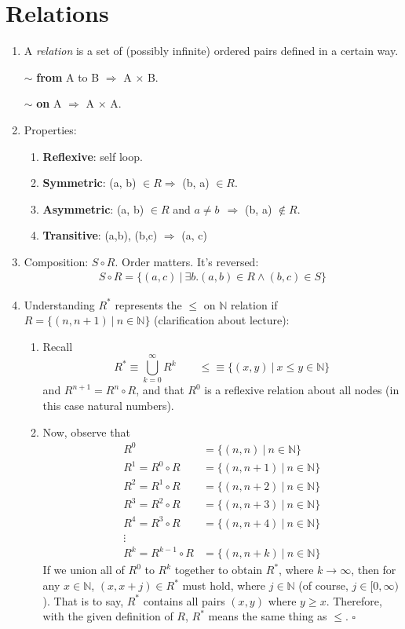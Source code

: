 \documentclass[10pt]{article}
\newcommand{\mapto}{\rightarrow}
\renewcommand{\ll}{\ |\ }
\begin{document}
\section{Relations}
\begin{enumerate}
    \item A \textit{relation} is a set of (possibly infinite) ordered pairs defined in a certain way.
    
    $\sim$ \textbf{from} A to B $\Rightarrow$ A $\times$ B. 
    
    $\sim$ \textbf{on} A $\Rightarrow$ A $\times$ A.
    \item Properties:
    \begin{enumerate}
        \item \textbf{Reflexive}: self loop.
        \item \textbf{Symmetric}: (a, b) $\in R \Rightarrow$ (b, a) $\in R$.
        \item \textbf{Asymmetric}: (a, b) $\in R$ and $a\neq b\ \ \Rightarrow$ (b, a) $\not\in R$.
        \item \textbf{Transitive}: (a,b), (b,c) $\Rightarrow$ (a, c)
    \end{enumerate}
  \item Composition: $S\circ R$. Order matters. It's reversed:
    \begin{align*}
      S\circ R = \{(a,c) \ll \exists b. (a,b)\in R\land (b,c)\in S\}
    \end{align*}
  \item Understanding $R^*$ represents the $\leq$ on $\mathbb{N}$ relation if $R=\{(n,n+1)\ll n\in\mathbb{N}\}$ (clarification about lecture):
    \begin{enumerate}[label=\roman*)]
    \item Recall $$R^*\equiv\bigcup_{k=0}^{\infty} R^k \qquad \leq\equiv\{(x,y)\ll x \leq y \in\mathbb{N}\}$$
      and $R^{n+1}=R^{n}\circ R$, and that $R^0$ is a reflexive relation about all nodes (in this case natural numbers).
    \item Now, observe that
      \begin{align*}
        R^0 &= \{(n,n)\ll n\in\mathbb{N}\}\\
        R^1 = R^0\circ R &= \{(n,n+1)\ll n\in\mathbb{N}\}\\
        R^2 = R^1\circ R &= \{(n,n+2)\ll n\in\mathbb{N}\}\\
        R^3 = R^2\circ R &= \{(n,n+3)\ll n\in\mathbb{N}\}\\
        R^4 = R^3\circ R &= \{(n,n+4)\ll n\in\mathbb{N}\}\\
        \vdots\\
        R^k = R^{k-1}\circ R &= \{(n,n+k)\ll n\in\mathbb{N}\}
      \end{align*}      
      If we union all of $R^0$ to $R^k$ together to obtain $R^*$, where $k\mapto\infty$, then for any $x\in\mathbb{N}$, $(x, x+j)\in R^*$ must hold, where $j\in\mathbb{N}$ (of course, $j\in[0,\infty)$). That is to say, $R^*$ contains all pairs $(x,y)$ where $y\geq x$. Therefore, with the given definition of $R$, $R^*$ means the same thing as $\leq$. $\square$
        

\end{enumerate}
\end{enumerate}
\end{document}
